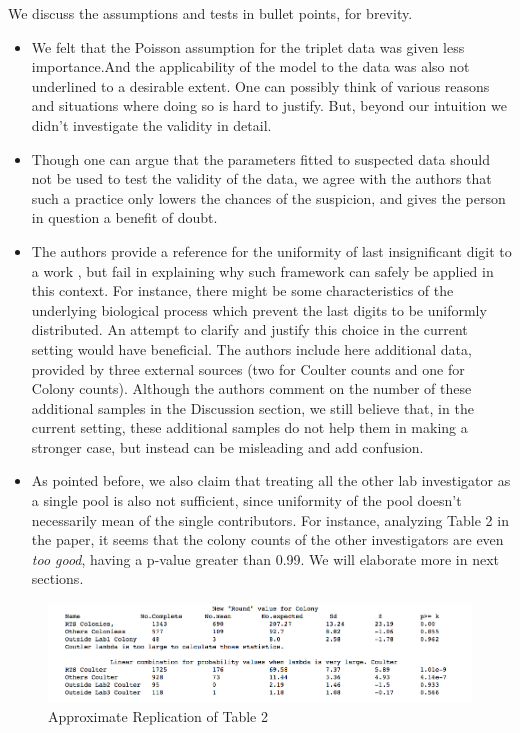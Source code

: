 \documentclass{article}
\begin{document}
We discuss the assumptions and tests in bullet points, for brevity.
\begin{itemize}
    \item We felt that the Poisson assumption for the triplet data was given less importance.And the applicability of the model to the data was also not underlined to a desirable extent. One can possibly think of various reasons and situations where doing so is hard to justify. But, beyond our intuition we didn't investigate the validity in detail.
    \item Though one can argue that the parameters fitted to suspected data should not be used to test the validity of the data, we agree with the authors that such a practice only lowers the chances of the suspicion, and gives the person in question a benefit of doubt.
    \item The authors provide a reference for the uniformity of last insignificant digit to a work \cite{mosimann2002terminal}, but fail in explaining why such framework can safely be applied in this context. For instance, there
    might be some characteristics of the underlying biological process which
    prevent the last digits to be uniformly distributed. An attempt to
    clarify and justify this choice in the current setting would have
    beneficial. The authors include here additional data, provided by three
    external sources (two for Coulter counts and one for Colony counts).
    Although the authors comment on the number of these additional samples
    in the Discussion section, we still believe that, in the current
    setting, these additional samples do not help them in making a stronger
    case, but instead can be misleading and add confusion.
    \item As pointed before, we also claim that treating all the other lab
    investigator as a single pool is also not sufficient, since uniformity
    of the pool doesn't necessarily mean of the single contributors. For
    instance, analyzing Table 2 in the paper, it seems that the colony
    counts of the other investigators are even \textit{too good}, having a
    p-value greater than 0.99. We will elaborate more in next sections.


\end{itemize}


\begin{figure}[htbp]
\centering
\includegraphics[width=0.9\linewidth]{images/HT_Stat_values.png}
\caption{Approximate Replication of Table 2}
\end{figure}
\end{document}
